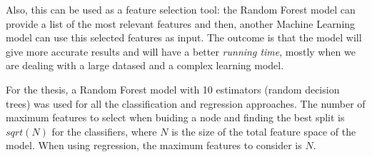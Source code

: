 Also, this can be used as a feature selection tool: the Random Forest model 
can provide a list of the most relevant features and then, another Machine 
Learning model can use this selected features as input. The outcome is that the 
model will give more accurate results and will have a better {\it running time}, 
mostly when we are dealing with a large datased and a complex learning model.

For the thesis, a Random Forest model with 10 estimators (random decision trees) 
was used for all the classification and regression approaches. The number of 
maximum features to select when buiding a node and finding the best split is 
$sqrt(N)$ for the classifiers, where $N$ is the size of the total feature 
space of the model. When using regression, the maximum features to consider 
is $N$. 
